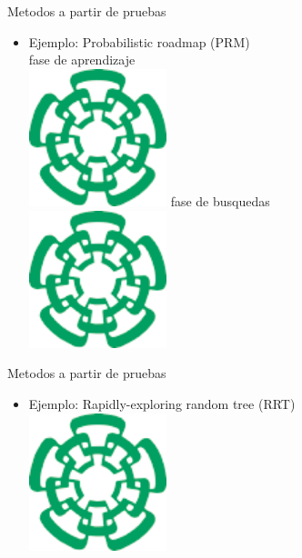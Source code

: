 \documentclass[
	11pt, %
]{beamer}
\begin{document}
\begin{frame}{Metodos a partir de pruebas}
  \begin{itemize}
  \item Ejemplo: Probabilistic roadmap (PRM)\\
    \centering
    fase de aprendizaje\\
    \includegraphics[angle=45,width=4cm]{cinvestavlogo}
    fase de busquedas\\
    \includegraphics[angle=45,width=4cm]{cinvestavlogo}
  \end{itemize}
\end{frame}

\begin{frame}{Metodos a partir de pruebas}
  \begin{itemize}
  \item Ejemplo: Rapidly-exploring random tree (RRT)\\
    \centering
    \includegraphics[angle=45,width=4cm]{cinvestavlogo}
  \end{itemize}
\end{frame}
\end{document}
